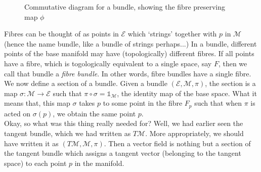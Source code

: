 \begin{figure}[H]
  \centering 
  
  \caption{Commutative diagram for a bundle, showing the fibre preserving map $\phi$}
\end{figure}
\noindent
Fibres can be thought of as points in $\mathcal{E}$ which `strings' together with $p$ in $\mathcal{M}$ (hence the name bundle, like a bundle of strings perhaps...) In a bundle, different points of the base manifold may have (topologically) different fibres. If all points have a fibre, which is togologically equivalent to a single space, say $F$, then we call that bundle a \textit{fibre bundle}. In other words, fibre bundles have a single fibre. \\[0.3cm]
We now define a section of a bundle. Given a bundle $(\mathcal{E}, \mathcal{M}, \pi)$, the section is a map $\sigma: \mathcal{M}\rightarrow \mathcal{E}$ such that $\pi \circ \sigma = \mathds{1}_\mathcal{M}$, the identity map of the base space. What it means that, this map $\sigma$ takes $p$ to some point in the fibre $F_p$ such that when $\pi$ is acted on $\sigma(p)$, we obtain the same point $p$.\\[0.2cm]
Okay, so what was this thing really needed for? Well, we had earlier seen the tangent bundle, which we had written as $T\mathcal{M}$. More appropriately, we should have written it as $(T\mathcal{M}, \mathcal{M}, \pi)$. Then a vector field is nothing but a section of the tangent bundle which assigns a tangent vector (belonging to the tangent space) to each point $p$ in the manifold. 

